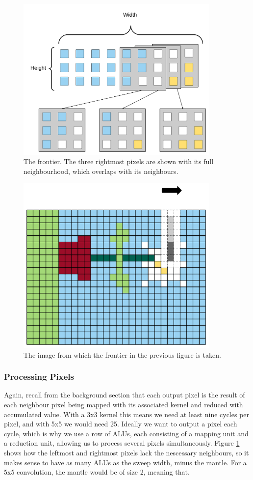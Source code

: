 \begin{figure}[h!]
    \centering
    \includegraphics[width=10cm]{img/frontier1.png}
    \caption{The frontier. The three rightmost pixels are shown with its full neighbourhood, which overlaps with its neighbours.}
    \label{fig:frontier1}
\end{figure}

\begin{figure}[h!]
    \centering
    \includegraphics[width=10cm]{img/frontier2.png}
    \caption{The image from which the frontier in the previous figure is taken.}
    \label{fig:frontier2}
\end{figure}

\subsubsection{Processing Pixels}
Again, recall from the background section that each output pixel is the result of each neighbour pixel being mapped with its associated kernel and reduced with accumulated value.
With a 3x3 kernel this means we need at least nine cycles per pixel, and with 5x5 we would need 25.
Ideally we want to output a pixel each cycle, which is why we use a row of ALUs, each consisting of a mapping unit and a reduction unit, allowing us to process several pixels simultaneously.
Figure \ref{fig:frontier1} shows how the leftmost and rightmost pixels lack the nescessary neighbours, so it makes sense to have as many ALUs as the sweep width, minus the mantle.
For a 5x5 convolution, the mantle would be of size 2, meaning that.

